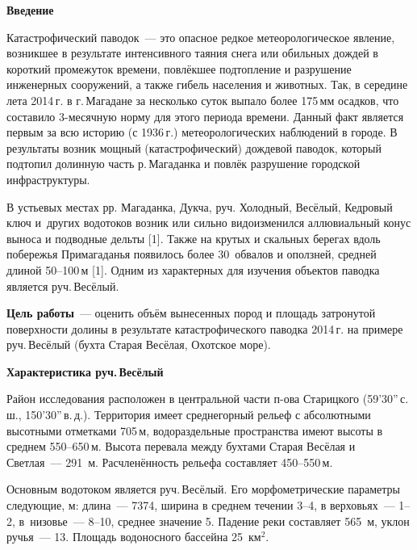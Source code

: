 \bigskip
{}



\makeProcTitleSchool



\textbf{Введение}

Катастрофический паводок~--- это опасное редкое метеорологическое явление, возникшее в результате интенсивного таяния снега или обильных дождей в короткий промежуток времени, повлёкшее подтопление и разрушение инженерных сооружений, а также гибель населения и животных. Так, в середине лета 2014\,г. в г.\,Магадане за несколько суток выпало более 175\,мм осадков, что составило 3-месячную норму для этого периода времени. Данный факт является первым за всю историю (с 1936\,г.) метеорологических наблюдений в городе. В результаты возник мощный (катастрофический) дождевой паводок, который подтопил долинную часть р.\,Магаданка и повлёк разрушение городской инфраструктуры.

В устьевых местах рр. Магаданка, Дукча, руч. Холодный, Весёлый, Кедровый ключ и~других водотоков возник или сильно видоизменился аллювиальный конус выноса и подводные дельты [1]. Также на крутых и скальных берегах вдоль побережья Примагаданья появилось более 30 обвалов и оползней, средней длиной 50--100\,м [1]. Одним из характерных для изучения объектов паводка является руч.\,Весёлый.

\textbf{Цель работы}~--- оценить объём вынесенных пород и площадь затронутой поверхности долины в результате катастрофического паводка 2014\,г. на примере руч.\,Весёлый (бухта Старая Весёлая, Охотское море).

\textbf{Характеристика руч.\,Весёлый}

Район исследования расположен в центральной части п-ова Старицкого (59’30”\,с.\,ш., 150’30”\,в.\,д.). Территория имеет среднегорный рельеф с абсолютными высотными отметками 705\,м, водораздельные пространства имеют высоты в среднем 550--650\,м. Высота перевала между бухтами Старая Весёлая и Светлая~--- 291 м. Расчленённость рельефа составляет 450--550\,м.

Основным водотоком является руч.\,Весёлый. Его морфометрические параметры следующие, м: длина~--- 7374, ширина в среднем течении 3--4, в верховьях~--- 1--2, в низовье~--- 8--10, среднее значение 5. Падение реки составляет 565~м, уклон ручья~--- 13. Площадь водоносного бассейна 25~км$^2$.

